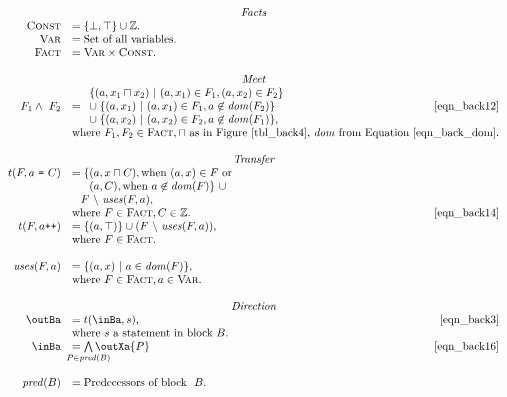 \begin{math}
  \begin{array}{rlr}

    \multicolumn{3}{c}{\emph{Facts}} \\

    \setLC &= \{\bot, \top\} \cup \ZZ.\\
    \setL{Var} &= \text{Set of all variables.} \\
    \setL{Fact} &= \setL{Var} \times \setLC. \\\\

    \multicolumn{3}{c}{\emph{Meet}} \\


    F_1 \wedge\ F_2 &= \begin{array}{l}
      \setdef{(a, x_1 \lub x_2)}{(a,x_1) \in F_1, (a,x_2) \in F_2} \\
        \cup \; \setdef{(a,x_1)}{(a,x_1) \in F_1, a \not\in \dom(F_2)} \\
        \cup \; \setdef{(a,x_2)}{(a,x_2) \in F_2, a \not\in \dom(F_1)},
    \end{array} \labeleq{eqn_back13} \labeleq{eqn_back12} & \eqref{eqn_back12} \\
    & \multicolumn{2}{l}{\ensuremath{\text{where\ } F_1, F_2 \in \setL{Fact}, \lub\ \text{as in Figure~\ref{tbl_back4},
          \mfun{dom} from Equation~\eqref{eqn_back_dom}.}}} \\\\

    \multicolumn{3}{c}{\emph{Transfer}} \\
    t (F, a\ \text{\tt =}\ C) &= \{(a, x \lub C), \text{when\ } (a, x) \in F\ \text{or} \\
    & \phantom{= \{}(a, C), \text{when\ } a \not\in \dom(F)\}\ \cup \\
    & \phantom{=} F\ \backslash\ \mfun{uses}(F, a),\\
    & \text{where\ } F \in \setL{Fact}, C \in \ZZ. \labeleq{eqn_back14} & \eqref{eqn_back14} \\
    t (F, a\text{\tt ++}) &= \{(a, \top)\} \cup (F\ \backslash\ \mfun{uses}(F, a)), \\
    & \text{where\ } F \in \setL{Fact}. \\\\
    \mfun{uses}(F, a) &= \{(a, x)\ |\ a \in \dom(F)\}, \\
    & \text{where\ } F \in \setL{Fact}, a \in \setL{Var}. \\\\

    \multicolumn{3}{c}{\emph{Direction}} \\

    \outBa &= t(\inBa, s), \labeleq{eqn_back3} & \eqref{eqn_back3} \\
    & \text{where $s$ a statement in block\ } B.\\
    \inBa &= \bigwedge\limits_{\mathclap{P \in \mathit{pred}(B)}} \outXa{P} \labeleq{eqn_back16} & \eqref{eqn_back16} \\\\ 
    \mfun{pred}(B) &= \text{Predecessors of block }\ B.
  \end{array}
\end{math}
